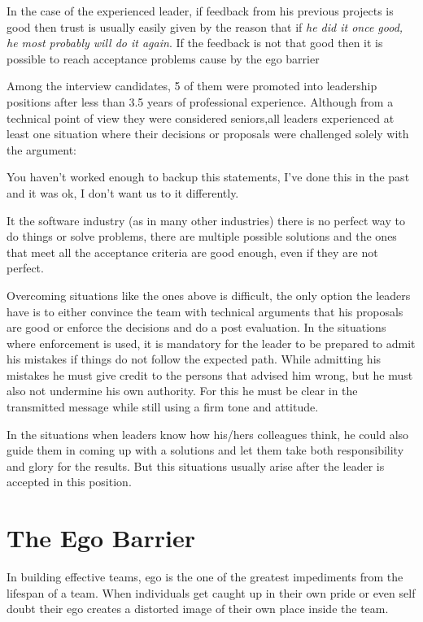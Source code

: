 In the case of the experienced leader, if feedback from his previous projects is good then trust is usually easily given by the reason that if \textit{he did it once good, he most probably will do it again}. If the feedback is not that good then it is possible to reach acceptance problems cause by the ego barrier \cite{sec:ego}

Among the interview candidates, 5 of them were promoted into leadership positions after less than 3.5 years of professional experience. Although from a technical point of view they were considered seniors,all  leaders experienced at least one situation where their decisions or proposals were challenged solely with the argument:
\begin{displayquote}
You haven't worked enough to backup this statements, I've done this in the past and it was ok, I don't want us to it differently.
\end{displayquote}
It the software industry (as in many other industries) there is no perfect way to do things or solve problems, there are multiple possible solutions and the ones that meet all the acceptance criteria are good enough, even if they are not perfect.

Overcoming situations like the ones above is difficult, the only option the leaders have is to either convince the team with technical arguments that his proposals are good or enforce the decisions and do a post evaluation. In the situations where enforcement is used, it is mandatory for the leader to be prepared to admit his mistakes if things do not follow the expected path. While admitting his mistakes he must give credit to the persons that advised him wrong, but he must also not undermine his own authority. For this he must be clear in the transmitted message while still using a firm tone and attitude. 

In the situations when leaders know how his/hers colleagues think, he could also guide them in coming up with a solutions and let them take both responsibility and glory for the results. But this situations usually arise after the leader is accepted in this position.
\section{The Ego Barrier}
\label{sec:ego}
In building effective teams, ego is the one of the greatest impediments from the lifespan of a team. When individuals get caught up in their own pride or even self doubt their ego creates a distorted image of their own place inside the team. 

